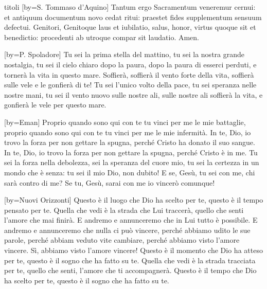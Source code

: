 \begin{songs}{titoli}
[by={S. Tommaso d'Aquino}]
\beginverse
Tantum ergo Sacramentum
veneremur cernui:
et antiquum documentum
novo cedat ritui:
praestet fides supplementum
sensuum defectui.
\endverse
\beginverse
Genitori, Genitoque
laus et iubilatio,
salus, honor, virtus quoque
sit et benedictio:
procedenti ab utroque
compar sit laudatio. Amen.
\endverse
\endsong

[by={P. Spoladore}]
\beginverse
Tu sei la prima stella del mattino,
tu sei la nostra grande nostalgia,
tu sei il cielo chiaro dopo la paura,
dopo la paura di esserci perduti,
e tornerà la vita in questo mare.
\endverse
\beginchorus
Soffierà, soffierà il vento forte della vita,
soffierà sulle vele e le gonfierà di te! 
\endchorus
\beginverse
Tu sei l'unico volto della pace,
tu sei speranza nelle nostre mani,
tu sei il vento nuovo sulle nostre ali,
sulle nostre ali soffierà la vita,
e gonfierà le vele per questo mare.
\endverse
\endsong

[by={Eman}]
\beginverse*
Proprio quando sono qui con te
tu vinci per me le mie battaglie,
proprio quando sono qui con te
tu vinci per me le mie infermità.
\endverse
\beginverse*
In te, Dio, io trovo la forza
per non gettare la spugna,
perché Cristo ha donato il suo sangue.
In te, Dio, io trovo la forza
per non gettare la spugna,
perché Cristo è in me.
\endverse
\beginchorus
Tu sei la forza nella debolezza,
sei la speranza del cuore mio,
tu sei la certezza in un mondo che è senza:
tu sei il mio Dio, non dubito!
\endchorus
\beginverse*
E se, Gesù, tu sei con me,
chi sarà contro di me?
Se tu, Gesù, sarai con me
io vincerò comunque! 
\endverse
\endsong

[by={Nuovi Orizzonti}]
\beginverse
Questo è il luogo che Dio ha scelto per te,
questo è il tempo pensato per te.
Quella che vedi è la strada che Lui traccerà,
quello che senti l'amore che mai finirà.
\endverse
\beginchorus
E andremo e annunceremo che
in Lui tutto è possibile.
E andremo e annunceremo che
nulla ci può vincere,
perché abbiamo udito le sue parole,
perché abbiam veduto vite cambiare,
perché abbiamo visto l'amore vincere.
Sì, abbiamo visto l'amore vincere!
\endchorus
\beginverse
Questo è il momento che Dio ha atteso per te,
questo è il sogno che ha fatto su te.
Quella che vedi è la strada tracciata per te,
quello che senti, l'amore che ti accompagnerà.
\endverse
\beginverse*
Questo è il tempo che Dio ha scelto per te,
questo è il sogno che ha fatto su te.
\endverse
\endsong


\end{songs}
